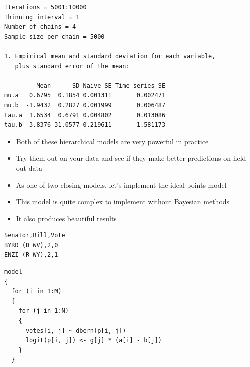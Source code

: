 \documentclass{beamer}
\begin{document}
\begin{frame}[fragile]
  \begin{verbatim}
Iterations = 5001:10000
Thinning interval = 1 
Number of chains = 4 
Sample size per chain = 5000 

1. Empirical mean and standard deviation for each variable,
   plus standard error of the mean:

         Mean      SD Naive SE Time-series SE
mu.a   0.6795  0.1854 0.001311       0.002471
mu.b  -1.9432  0.2827 0.001999       0.006487
tau.a  1.6534  0.6791 0.004802       0.013086
tau.b  3.8376 31.0577 0.219611       1.581173
  \end{verbatim}
\end{frame}

\begin{frame}[fragile]
  \begin{itemize}
    \item{Both of these hierarchical models are very powerful in practice}
    \item{Try them out on your data and see if they make better predictions on held out data}
  \end{itemize}
\end{frame}

\begin{frame}[fragile]
  \begin{itemize}
    \item{As one of two closing models, let's implement the ideal points model}
    \item{This model is quite complex to implement without Bayesian methods}
    \item{It also produces beautiful results}
  \end{itemize}
\end{frame}

\begin{frame}[fragile]
  \begin{verbatim}
Senator,Bill,Vote
BYRD (D WV),2,0
ENZI (R WY),2,1
  \end{verbatim}
\end{frame}

\begin{frame}[fragile]
  \begin{verbatim}
model
{
  for (i in 1:M)
  {
    for (j in 1:N)
    {
      votes[i, j] ~ dbern(p[i, j])
      logit(p[i, j]) <- g[j] * (a[i] - b[j])
    }
  }
  \end{verbatim}
\end{frame}
\end{document}
